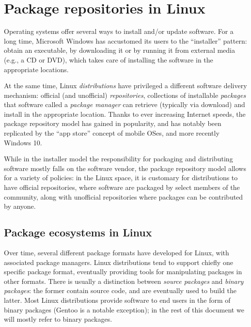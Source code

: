 \documentclass{deliverablereport}
\author{Luca De Feo \emph{et al.}}
\begin{document}
\maketitle
\githubissuedescription

\section{Package repositories in Linux}

Operating systems offer several ways to install and/or update
software. %
For a long time, Microsoft Windows has accustomed its users to the
``installer'' pattern: obtain an executable, by downloading it or by
running it from external media (e.g., a CD or DVD), which takes care
of installing the software in the appropriate locations.

At the same time, Linux \emph{distributions} have privileged a
different software delivery mechanism: official (and unofficial)
\emph{repositories}, collections of installable \emph{packages} that
software called a \emph{package manager} can retrieve (typically via
download) and install in the appropriate location. %
Thanks to ever increasing Internet speeds, the package repository
model has gained in popularity, and has notably been replicated by the
``app store'' concept of mobile OSes, and more recently Windows 10.

While in the installer model the responsibility for packaging and
distributing software mostly falls on the software vendor, the package
repository model allows for a variety of policies: in the Linux space,
it is customary for distributions to have official repositories, where
software are packaged by select members of the community, along with
unofficial repositories where packages can be contributed by anyone.

\subsection{Package ecosystems in Linux}

Over time, several different package formats have developed for Linux,
with associated package managers. %
Linux distributions tend to support chiefly one specific package
format, eventually providing tools for manipulating packages in other
formats. %
There is usually a distinction between \emph{source packages} and
\emph{binary packages}: the former contain source code, and are
eventually used to build the latter. %
Most Linux distributions provide software to end users in the form of
binary packages (Gentoo is a notable exception); in the rest of this
document we will mostly refer to binary packages.
\end{document}
